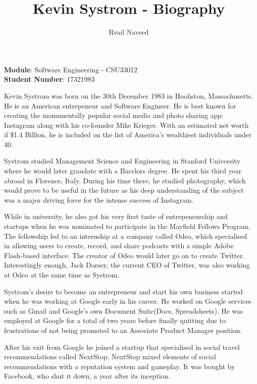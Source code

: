 \documentclass[12pt]{article}
\title{\textbf{Kevin  Systrom -  Biography}}
\author{Rvail Naveed}
\date{}
\begin{document}
    \maketitle

    \begin{center}
        \textbf{Module}: Software Engineering - CSU33012 \\
        \textbf{Student Number}: 17321983 
    \end{center}

    \newpage

    Kevin Systrom was born on the 30th December 1983 in Hooliston, Massachusetts. He is 
    an American entrepeneur and Software Engineer. He is best known for creating the monumentally
    popular social media and photo sharing app: Instagram along with his co-founder Mike Krieger. With an estimated net
    worth if \$1.4 Billion, he is included on the list of America's wealthiest individuals under 40.

    Systrom studied Management Science and Engineering in Stanford University 
    where he would later graudate with a Bacelors degree. He spent his third year abroad in Florence, Italy.
    During his time there, he studied photography, which would prove to be useful in the future as his deep understanding of the subject
    was a major driving force for the intense success of Instagram.

    While in university, 
    he also got his very first taste of entrepeneurship 
    and startups when he was nominated to participate in the Mayfield Fellows Program. 
    The fellowship led to an internship at a company called Odeo, which specialised in allowing users to
    create, record, and share podcasts with a simple Adobe Flash-based interface.
    The creator of Odeo
    would later go on to create Twitter. Interestingly enough, Jack Dorsey, the current CEO of Twitter, 
    was also working at Odeo at the same time as Systrom.

    Systrom's desire to become an entrepreneur
    and start his own business started when he was working at Google early in his career. He worked on Google services such as Gmail and Google's own
    Document Suite(Docs, Spreadsheets). He was employed at Google for a total of two years before finally quitting
    due to frustrations of not being promoted to an Associate Product Manager position.

    After his exit from Google he joined a startup that specialised in social travel recommendations called 
    NextStop. NextStop mixed elements of social recommendations
    with a reputation system and gameplay. It was bought by Facebook, who shut it down, a year after its inception.
\end{document}

